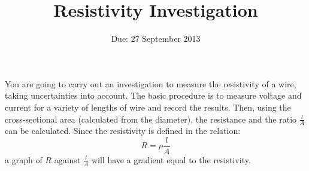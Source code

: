\documentclass[11pt]{article}
\title{Resistivity Investigation}
\author{}
\date{Due: 27 September 2013}
\begin{document}
\maketitle \thispagestyle{empty}
\begin{adjustwidth}{2cm}{2cm}
You are going to carry out an investigation to measure the resistivity of a wire, taking uncertainties into account.  The basic procedure is to measure voltage and current for a variety of lengths of wire and record the results.  Then, using the cross-sectional area (calculated from the diameter), the resistance and the ratio $ \frac{l}{A} $ can be calculated.  Since the resistivity is defined in the relation: \[ R = \rho \frac{l}{A} \] a graph of $ R $ against $ \frac{l}{A} $ will have a gradient equal to the resistivity.
\end{adjustwidth}
\end{document}
